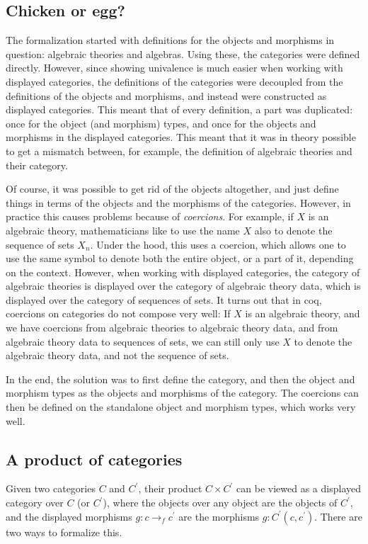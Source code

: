 \subsection{Chicken or egg?}
The formalization started with definitions for the objects and morphisms in question: algebraic theories and algebras. Using these, the categories were defined directly. However, since showing univalence is much easier when working with displayed categories, the definitions of the categories were decoupled from the definitions of the objects and morphisms, and instead were constructed as displayed categories. This meant that of every definition, a part was duplicated: once for the object (and morphism) types, and once for the objects and morphisms in the displayed categories. This meant that it was in theory possible to get a mismatch between, for example, the definition of algebraic theories and their category.

Of course, it was possible to get rid of the objects altogether, and just define things in terms of the objects and the morphisms of the categories. However, in practice this causes problems because of \textit{coercions}. For example, if $ X $ is an algebraic theory, mathematicians like to use the name $ X $ also to denote the sequence of sets $ X_n $. Under the hood, this uses a coercion, which allows one to use the same symbol to denote both the entire object, or a part of it, depending on the context. However, when working with displayed categories, the category of algebraic theories is displayed over the category of algebraic theory data, which is displayed over the category of sequences of sets. It turns out that in coq, coercions on categories do not compose very well: If $ X $ is an algebraic theory, and we have coercions from algebraic theories to algebraic theory data, and from algebraic theory data to sequences of sets, we can still only use $ X $ to denote the algebraic theory data, and not the sequence of sets.

In the end, the solution was to first define the category, and then the object and morphism types as the objects and morphisms of the category. The coercions can then be defined on the standalone object and morphism types, which works very well.

\subsection{A product of categories}\label{subsec:displayed-product}
Given two categories $ C $ and $ C^\prime $, their product $ C \times C^\prime $ can be viewed as a displayed category over $ C $ (or $ C^\prime $), where the objects over any object are the objects of $ C^\prime $, and the displayed morphisms $ g: c \to_f c^\prime $ are the morphisms $ g: C^\prime(c, c^\prime) $. There are two ways to formalize this.

